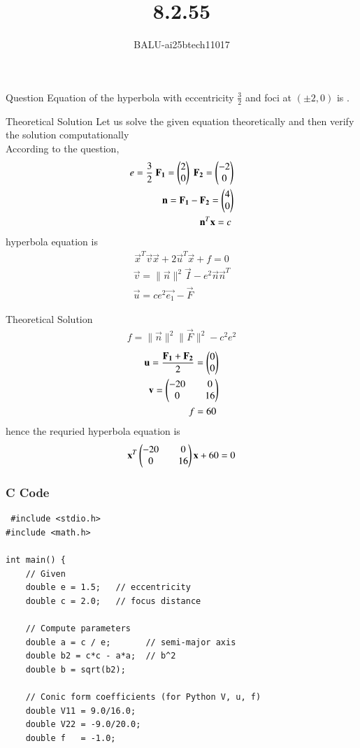 \documentclass{beamer}
\title %
{8.2.55}
\author %
{BALU-ai25btech11017}
\begin{document}
\frame{\titlepage}
\begin{frame}{Question}
Equation of the hyperbola with eccentricity \( \frac{3}{2} \) and foci at \( (\pm 2, 0) \) is \underline{\hspace{3cm}}.
\\ 
\end{frame}
\begin{frame}{Theoretical Solution}
Let us solve the given equation theoretically and then verify the solution computationally \\
According to the question, \\
\begin{align}
e=\frac{3}{2}\
\mathbf{F_1}=\begin{pmatrix}2\\0\end{pmatrix}\
\mathbf{F_2}=\begin{pmatrix}-2\\0\end{pmatrix}\\
\mathbf{n}=\mathbf{F_1}-\mathbf{F_2}=\begin{pmatrix}4\\0\end{pmatrix}\\
\mathbf{n}^T\mathbf{x}=c\
\end{align}
hyperbola equation is\\
\begin{align}
   \vec{x}^T\vec{v}\vec{x}+2\vec{u}^T\vec{x}+f=0
\end{align}
\begin{align}
   \vec{v}=\|\vec{n}\|^2\vec{I}-e^2\vec{n}\vec{n}^T\\
   \vec{u}=ce^2\vec{e_1}-\vec{F}\
   \end{align}
\end{frame}
\begin{frame}{Theoretical Solution}
\begin{align}
   f=\|\vec{n}\|^2\|\vec{F}\|^2-c^2e^2
\end{align}
\begin{align}
    \mathbf{u}=\frac{\mathbf{F_1}+\mathbf{F_2}}{2}=\begin{pmatrix}0\\0\end{pmatrix}\\
    \mathbf{v}=\begin{pmatrix}-20&&0\\0&&16\end{pmatrix}\\
    f=60\
\end{align}
hence the requried hyperbola equation is
\begin{align}
   \mathbf{x}^T\begin{pmatrix}-20&&0\\0&&16\end{pmatrix}\mathbf{x}+60=0
\end{align}
\end{frame}
\begin{frame}[fragile]
    \frametitle{C Code}

    \begin{lstlisting}
 #include <stdio.h>
#include <math.h>

int main() {
    // Given
    double e = 1.5;   // eccentricity
    double c = 2.0;   // focus distance

    // Compute parameters
    double a = c / e;       // semi-major axis
    double b2 = c*c - a*a;  // b^2
    double b = sqrt(b2);

    // Conic form coefficients (for Python V, u, f)
    double V11 = 9.0/16.0;
    double V22 = -9.0/20.0;
    double f   = -1.0;

  

  

    \end{lstlisting}
\end{frame}
\end{document}

